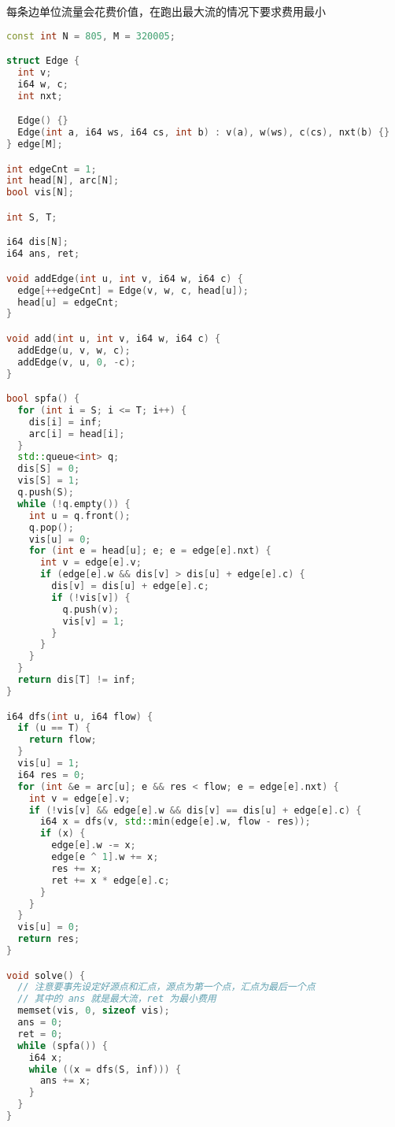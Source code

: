 \documentclass[a4paper,10pt]{article}
\begin{document}
每条边单位流量会花费价值，在跑出最大流的情况下要求费用最小
\begin{lstlisting}[language=c++]
const int N = 805, M = 320005;

struct Edge {
  int v;
  i64 w, c; 
  int nxt;

  Edge() {}
  Edge(int a, i64 ws, i64 cs, int b) : v(a), w(ws), c(cs), nxt(b) {}
} edge[M];

int edgeCnt = 1; 
int head[N], arc[N];
bool vis[N];

int S, T;

i64 dis[N];
i64 ans, ret; 

void addEdge(int u, int v, i64 w, i64 c) {
  edge[++edgeCnt] = Edge(v, w, c, head[u]);
  head[u] = edgeCnt; 
}

void add(int u, int v, i64 w, i64 c) {
  addEdge(u, v, w, c);
  addEdge(v, u, 0, -c);
}

bool spfa() {
  for (int i = S; i <= T; i++) {
    dis[i] = inf; 
    arc[i] = head[i]; 
  }
  std::queue<int> q;
  dis[S] = 0; 
  vis[S] = 1; 
  q.push(S); 
  while (!q.empty()) {
    int u = q.front();
    q.pop(); 
    vis[u] = 0; 
    for (int e = head[u]; e; e = edge[e].nxt) {
      int v = edge[e].v;
      if (edge[e].w && dis[v] > dis[u] + edge[e].c) {
        dis[v] = dis[u] + edge[e].c;
        if (!vis[v]) {
          q.push(v); 
          vis[v] = 1; 
        }
      }
    }
  }
  return dis[T] != inf;
}

i64 dfs(int u, i64 flow) {
  if (u == T) {
    return flow;
  }
  vis[u] = 1; 
  i64 res = 0; 
  for (int &e = arc[u]; e && res < flow; e = edge[e].nxt) {
    int v = edge[e].v;
    if (!vis[v] && edge[e].w && dis[v] == dis[u] + edge[e].c) {
      i64 x = dfs(v, std::min(edge[e].w, flow - res));
      if (x) {
        edge[e].w -= x; 
        edge[e ^ 1].w += x; 
        res += x; 
        ret += x * edge[e].c;
      }
    }
  }
  vis[u] = 0; 
  return res; 
}

void solve() { 
  // 注意要事先设定好源点和汇点，源点为第一个点，汇点为最后一个点
  // 其中的 ans 就是最大流，ret 为最小费用
  memset(vis, 0, sizeof vis); 
  ans = 0; 
  ret = 0; 
  while (spfa()) {
    i64 x; 
    while ((x = dfs(S, inf))) {
      ans += x; 
    }
  }
}
\end{lstlisting}
\end{document}
